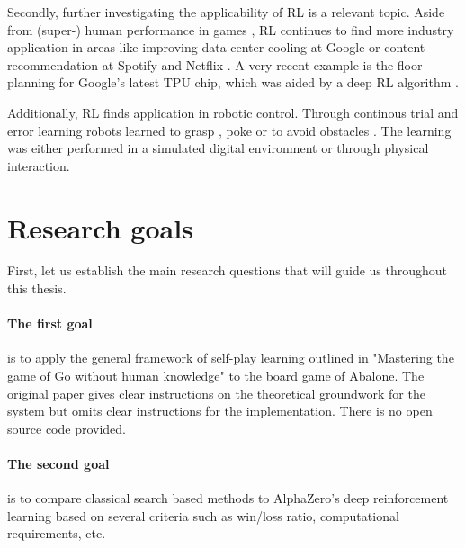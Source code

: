 Secondly, further investigating the applicability of RL is a relevant topic. Aside from (super-) human performance in games \cite{mnih_human-level_2015, berner_dota_2019,vinyals_grandmaster_2019}, RL continues to find more industry application in areas like improving data center cooling at Google \cite{gamble_safety-first_2018} or content recommendation at Spotify \cite{jebara_for_2020} and Netflix \cite{siddiqi_ml_2019}. A very recent example is the floor planning for Google's latest TPU chip, which was aided by a deep RL algorithm \cite{mirhoseini_graph_2021}.

Additionally, RL finds application in robotic control. Through continous trial and error learning robots learned to grasp \cite{pinto_supersizing_2016,zeng_learning_2018}, poke \cite{agrawal_learning_nodate} or to avoid obstacles \cite{kahn_uncertainty-aware_2017}. The learning was either performed in a simulated digital environment or through physical interaction.

\section{Research goals}
First, let us establish the main research questions that will guide us throughout this thesis.

\paragraph{The first goal} is to apply the general framework of self-play learning outlined in "Mastering the game of Go without human knowledge" to the board game of Abalone. \cite{silver_mastering_2017} The original paper gives clear instructions on the theoretical groundwork for the system but omits clear instructions for the implementation. There is no open source code provided.

\paragraph{The second goal} is to compare classical search based methods to AlphaZero's deep reinforcement learning based on several criteria such as win/loss ratio, computational requirements, etc.
